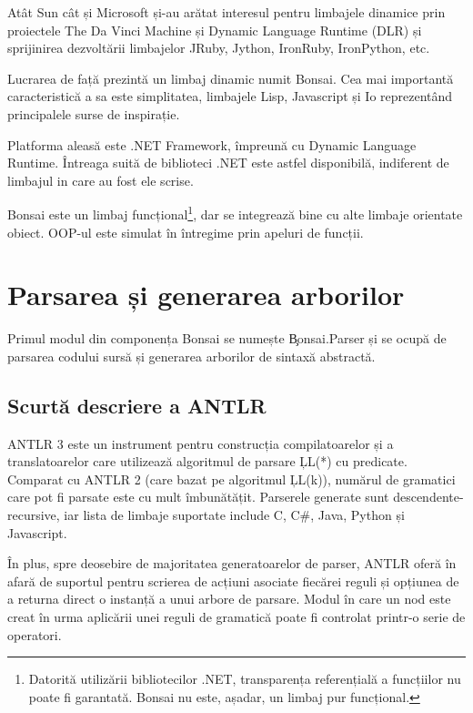 \documentclass[12pt,a4paper]{memoir}
\begin{document}
Atât Sun cât și Microsoft și-au arătat interesul pentru limbajele dinamice prin proiectele The Da Vinci Machine\cite{daVinciMachine} și Dynamic Language Runtime (DLR)\cite{dlr} și sprijinirea dezvoltării limbajelor JRuby\cite{jruby}, Jython\cite{jython}, IronRuby\cite{ironruby}, IronPython\cite{ironpython}, etc.

Lucrarea de față prezintă un limbaj dinamic numit Bonsai. Cea mai importantă caracteristică a sa este simplitatea, limbajele Lisp, Javascript și Io\cite{io} reprezentând principalele surse de inspirație.

Platforma aleasă este .NET Framework, împreună cu Dynamic Language Runtime. Întreaga suită de biblioteci .NET este astfel disponibilă, indiferent de limbajul in care au fost ele scrise. 

Bonsai este un limbaj funcțional\footnote{Datorită utilizării bibliotecilor .NET, transparența referențială a funcțiilor nu poate fi garantată. Bonsai nu este, așadar, un limbaj pur funcțional.}, dar se integrează bine cu alte limbaje orientate obiect. OOP-ul este simulat în întregime prin apeluri de funcții.

\chapter{Parsarea și generarea arborilor}

Primul modul din componența Bonsai se numește \c{Bonsai.Parser} și se ocupă de parsarea codului sursă și generarea arborilor de sintaxă abstractă.

\section{Scurtă descriere a ANTLR}

ANTLR 3\cite{antlr} este un instrument pentru construcția compilatoarelor și a translatoarelor care utilizează algoritmul de parsare \c{LL(*)} cu predicate\cite{definitive_antlr_reference}. Comparat cu ANTLR 2 (care bazat pe algoritmul \c{LL(k)}), numărul de gramatici care pot fi parsate este cu mult îmbunătățit. Parserele generate sunt descendente-recursive, iar lista de limbaje suportate\cite{antlr_targets} include C, C\#, Java, Python și Javascript. 

În plus, spre deosebire de majoritatea generatoarelor de parser, ANTLR oferă în afară de suportul pentru scrierea de acțiuni asociate fiecărei reguli și opțiunea de a returna direct o instanță a unui arbore de parsare. Modul în care un nod este creat în urma aplicării unei reguli de gramatică poate fi controlat printr-o serie de operatori\cite[cap. 7]{definitive_antlr_reference}.
\end{document}
